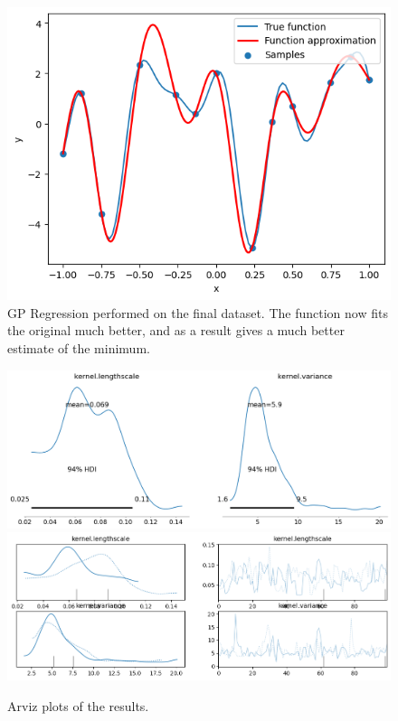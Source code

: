 \begin{figure}[H]
\centering
\includegraphics[width=0.5\linewidth]{images/output.png}
\caption{GP Regression performed on the final dataset. The function now fits the original much better, and as a result gives a much better estimate of the minimum.}
\label{fig:output}
\end{figure}


\begin{figure}[H]
\centering
\includegraphics[width=0.75\linewidth]{images/arviz_0.png}\\
\includegraphics[width=0.75\linewidth]{images/arviz_1.png}
\caption{Arviz plots of the results.}
\label{fig:arviz_new}
\end{figure}
